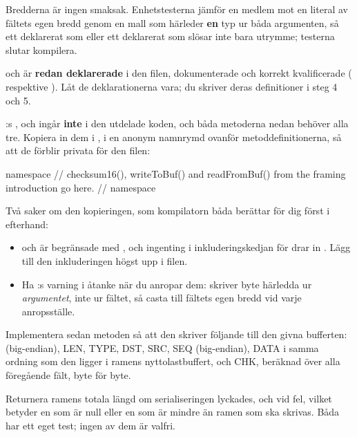Bredderna är ingen smaksak. Enhetstesterna jämför en medlem mot en literal av fältets egen bredd
genom en mall som härleder \textbf{en} typ ur båda argumenten, så ett  deklarerat som
 eller ett  deklarerat som  slösar inte bara
utrymme; testerna slutar kompilera.

 och  är \textbf{redan deklarerade} i den filen, dokumenterade
och korrekt kvalificerade ( respektive ). Låt de deklarationerna
vara; du skriver deras definitioner i steg 4 och 5.

:s ,  och  ingår
\textbf{inte} i den utdelade koden, och båda metoderna nedan behöver alla tre. Kopiera in dem i
, i en anonym namnrymd ovanför metoddefinitionerna, så att de förblir privata
för den filen:

\begin{cppcode}
namespace
{
// checksum16(), writeToBuf() and readFromBuf() from the framing introduction go here.
} // namespace
\end{cppcode}

Två saker om den kopieringen, som kompilatorn båda berättar för dig först i efterhand:
\begin{itemize}
  \item {} och  är begränsade med , och
    ingenting i inkluderingskedjan för  drar in . Lägg till den
    inkluderingen högst upp i filen.
  \item Ha :s varning i åtanke när du anropar dem: 
    skriver  byte härledda ur \emph{argumentet}, inte ur fältet, så casta till
    fältets egen bredd vid varje anropsställe.
\end{itemize}

Implementera sedan metoden  så att den skriver följande till den
givna bufferten:  (big-endian), LEN, TYPE, DST, SRC, SEQ (big-endian), DATA i
samma ordning som den ligger i ramens nyttolastbuffert, och CHK, beräknad över alla föregående fält,
byte för byte.

Returnera ramens totala längd om serialiseringen lyckades, och  vid fel, vilket betyder en
 som är null eller en  som är mindre än ramen som ska skrivas. Båda har ett
eget test; ingen av dem är valfri.

